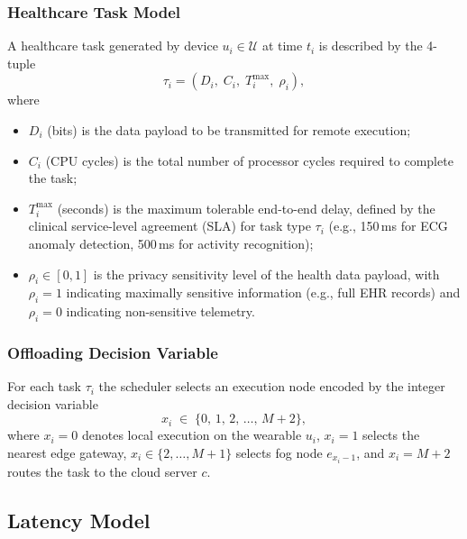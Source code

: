 \documentclass[journal,twoside,letterpaper]{IEEEtran}
\newcommand{\set}[1]{\mathcal{#1}}
\begin{document}
\subsubsection{Healthcare Task Model}

A healthcare task generated by device $u_i \in \set{U}$ at time $t_i$ is
described by the 4-tuple
\begin{equation}
  \tau_i = \left(D_i,\; C_i,\; T^{\max}_i,\; \rho_i\right),
  \label{eq:task_tuple}
\end{equation}
where
\begin{itemize}
  \item $D_i$ (bits) is the data payload to be transmitted for remote execution;
  \item $C_i$ (CPU cycles) is the total number of processor cycles required to
        complete the task;
  \item $T^{\max}_i$ (seconds) is the maximum tolerable end-to-end delay,
        defined by the clinical service-level agreement (SLA) for task type
        $\tau_i$ (e.g., 150\,ms for ECG anomaly detection, 500\,ms for
        activity recognition);
  \item $\rho_i \in [0,1]$ is the privacy sensitivity level of the health data
        payload, with $\rho_i = 1$ indicating maximally sensitive information
        (e.g., full EHR records) and $\rho_i = 0$ indicating non-sensitive
        telemetry.
\end{itemize}

\subsubsection{Offloading Decision Variable}

For each task $\tau_i$ the scheduler selects an execution node encoded by
the integer decision variable
\begin{equation}
  x_i \;\in\; \{0,\, 1,\, 2,\, \ldots,\, M+2\},
  \label{eq:decision_var}
\end{equation}
where $x_i = 0$ denotes local execution on the wearable $u_i$,
$x_i = 1$ selects the nearest edge gateway, $x_i \in \{2, \ldots, M+1\}$
selects fog node $e_{x_i - 1}$, and $x_i = M+2$ routes the task to the
cloud server $c$.

\subsection{Latency Model}
\label{subsec:latency}
\end{document}
